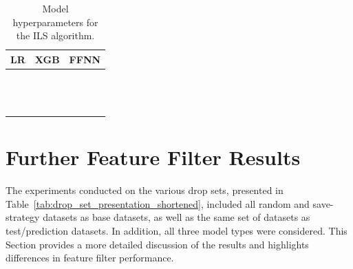 \begin{table}[!ht]
	\centering
	\small
	\caption{Model hyperparameters for the ILS algorithm.}
	\label{tab:hyperparams_model_performance}
	\renewcommand{\arraystretch}{1.1}
	\begin{tabular}{@{}c P{0.3\textwidth}P{0.3\textwidth}@{}}
		\toprule
		\textbf{LR}                  & \textbf{XGB}                    & \textbf{FFNN}                      \\
		\midrule
		             &  &  \\
		                  &       &                   \\
		           &              &                      \\
		         &          &               \\
		 &        &                    \\
		       &              &              \\
		             &      &             \\
		                             &             &               \\
		                             &            &                    \\
		                             &  &              \\
		                             &          &                    \\
		                             &                 &                                    \\
		                             &           &                                    \\
		\bottomrule
	\end{tabular}
\end{table}

\clearpage
\section{Further Feature Filter Results}
\label{app:sec:further_feature_filter}
The experiments conducted on the various drop sets, presented in Table~\ref{tab:drop_set_presentation_shortened}, included all
random and save-strategy datasets as base datasets, as well as the same set of datasets as test/prediction datasets.
In addition, all three model types were considered. This Section provides a more detailed discussion of the
results and highlights differences in feature filter performance.

